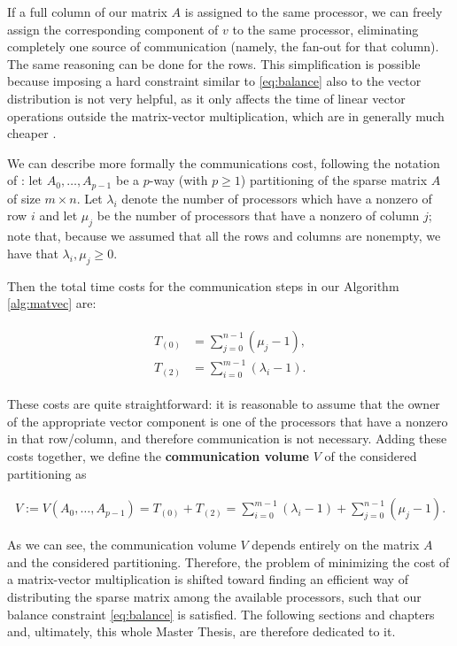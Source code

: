If a full column of our matrix $A$ is assigned to the same processor, we can freely assign the corresponding component of $v$ to the same processor, eliminating completely one source of communication (namely, the fan-out for that column). The same reasoning can be done for the rows. This simplification is possible because imposing a hard constraint similar to \eqref{eq:balance} also to the vector distribution is not very helpful, as it only affects the time of linear vector operations outside the matrix-vector multiplication, which are in generally much cheaper \cite[Sec.~3]{mondriaan}. 

We can describe more formally the communications cost, following the notation of \cite[Def.~2.1]{mondriaan}: let $A_0,\dots,A_{p-1}$ be a $p$-way (with $p \geq 1$) partitioning of the sparse matrix $A$ of size $m \times n$. Let $\lambda_i$ denote the number of processors which have a nonzero of row $i$ and let $\mu_j$ be the number of processors that have a nonzero of column $j$; note that, because we assumed that all the rows and columns are nonempty, we have that $\lambda_i, \mu_j \geq 0$.

Then the total time costs for the communication steps in our Algorithm \ref{alg:matvec} are:

\begin{align}
	\begin{aligned}
		T_{(0)} &= \sum_{j=0}^{n-1} (\mu_j -1), \\
		T_{(2)} &= \sum_{i=0}^{m-1} (\lambda_i -1).
	\end{aligned} \label{eq:T_comm}
\end{align}

These costs are quite straightforward: it is reasonable to assume that the owner of the appropriate vector component is one of the processors that have a nonzero in that row/column, and therefore communication is not necessary. Adding these costs together, we define the \textbf{communication volume} $V$ of the considered partitioning as

\begin{align}
	V := V(A_0,\dots,A_{p-1}) = T_{(0)} + T_{(2)} = \sum_{i=0}^{m-1} (\lambda_i -1) + \sum_{j=0}^{n-1} (\mu_j-1).
	\label{eq:volume}
\end{align}

As we can see, the communication volume $V$ depends entirely on the matrix $A$ and the considered partitioning. Therefore, the problem of minimizing the cost of a matrix-vector multiplication is shifted toward finding an efficient way of distributing the sparse matrix among the available processors, such that our balance constraint \eqref{eq:balance} is satisfied. The following sections and chapters and, ultimately, this whole Master Thesis, are therefore dedicated to it.

